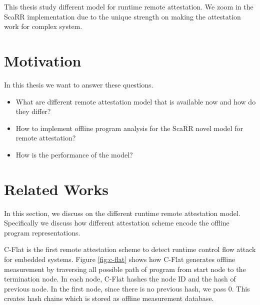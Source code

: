 This thesis study different model for runtime remote attestation. We zoom in the
ScaRR implementation due to the unique strength on making the attestation work
for complex system.

\section{Motivation}

In this thesis we want to answer these questions.
\begin{itemize}
    \item What are different remote attestation model that is available now and
    how do they differ?
    \item How to implement offline program analysis for the ScaRR novel model
    for remote attestation?
    \item How is the performance of the model?
\end{itemize}

\section{Related Works}

In this section, we discuss on the different runtime remote attestation
model. Specifically we discuss how different attestation scheme encode the
offline program representations.

C-Flat \cite{aberaCFLATControlFlowAttestation2016} is the first remote
attestation scheme to detect runtime control flow attack for embedded systems.
Figure \ref{fig:c-flat} shows how C-Flat generates offline measurement by
traversing all possible path of program from start node to the termination node.
In each node, C-Flat hashes the node ID and the hash of previous node. In the
first node, since there is no previous hash, we pass 0. This creates hash chains
which is stored as offline measurement database.

